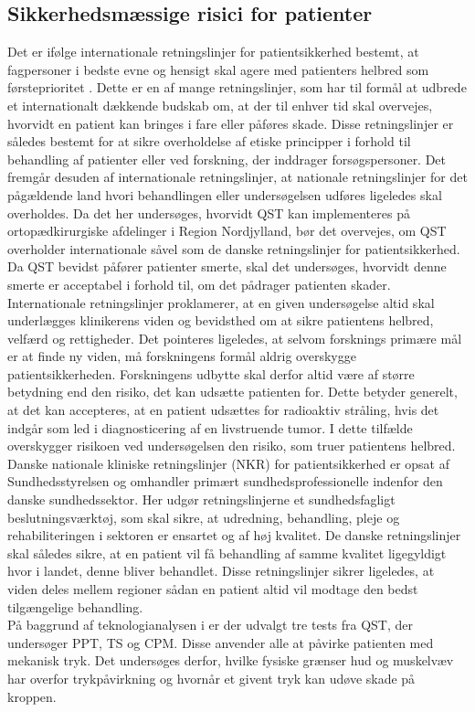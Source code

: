 \subsection{Sikkerhedsmæssige risici for patienter}
Det er ifølge internationale retningslinjer for patientsikkerhed bestemt, at fagpersoner i bedste evne og hensigt skal agere med patienters helbred som førsteprioritet \cite{helsinki2013}. Dette er en af mange retningslinjer, som har til formål at udbrede et internationalt dækkende budskab om, at der til enhver tid skal overvejes, hvorvidt en patient kan bringes i fare eller påføres skade. Disse retningslinjer er således bestemt for at sikre overholdelse af etiske principper i forhold til behandling af patienter eller ved forskning, der inddrager forsøgspersoner. Det fremgår desuden af internationale retningslinjer, at nationale retningslinjer for det pågældende land hvori behandlingen eller undersøgelsen udføres ligeledes skal overholdes. Da det her undersøges, hvorvidt QST kan implementeres på ortopædkirurgiske afdelinger i Region Nordjylland, bør det overvejes, om QST overholder internationale såvel som de danske retningslinjer for patientsikkerhed. \cite{helsinki2013} \\
Da QST bevidst påfører patienter smerte, skal det undersøges, hvorvidt denne smerte er acceptabel i forhold til, om det pådrager patienten skader. Internationale retningslinjer proklamerer, at en given undersøgelse altid skal underlægges klinikerens viden og bevidsthed om at sikre patientens helbred, velfærd og rettigheder. Det pointeres ligeledes, at selvom forsknings primære mål er at finde ny viden, må forskningens formål aldrig overskygge patientsikkerheden. Forskningens udbytte skal derfor altid være af større betydning end den risiko, det kan udsætte patienten for. \cite{helsinki2013} Dette betyder generelt, at det kan accepteres, at en patient udsættes for radioaktiv stråling, hvis det indgår som led i diagnosticering af en livstruende tumor. I dette tilfælde overskygger risikoen ved undersøgelsen den risiko, som truer patientens helbred. Danske nationale kliniske retningslinjer (NKR) for patientsikkerhed er opsat af Sundhedsstyrelsen og omhandler primært sundhedsprofessionelle indenfor den danske sundhedssektor. Her udgør retningslinjerne et sundhedsfagligt beslutningsværktøj, som skal sikre, at udredning, behandling, pleje og rehabiliteringen i sektoren er ensartet og af høj kvalitet. \citep{nkr2016} \citep{kommissorium2012} De danske retningslinjer skal således sikre, at en patient vil få behandling af samme kvalitet ligegyldigt hvor i landet, denne bliver behandlet. Disse retningslinjer sikrer ligeledes, at viden deles mellem regioner sådan en patient altid vil modtage den bedst tilgængelige behandling. \cite{nkr2016} \\
På baggrund af teknologianalysen i  er der udvalgt tre tests fra QST, der undersøger PPT, TS og CPM. Disse anvender alle at påvirke patienten med mekanisk tryk. Det undersøges derfor, hvilke fysiske grænser hud og muskelvæv har overfor trykpåvirkning og hvornår et givent tryk kan udøve skade på kroppen. \\

